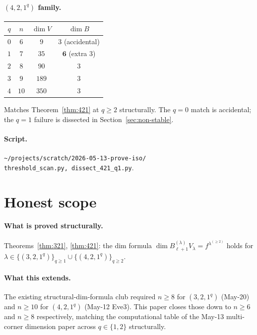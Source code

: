 \documentclass[11pt]{article}
\theoremstyle{definition}
\begin{document}
\paragraph{$(4, 2, 1^q)$ family.}
\begin{center}
\begin{tabular}{cccc}
\toprule
$q$ & $n$ & $\dim V$ & $\dim B$ \\
\midrule
$0$ & $6$  & $9$    & $3$ (accidental) \\
$1$ & $7$  & $35$   & $\mathbf{6}$ (extra $3$) \\
$2$ & $8$  & $90$   & $3$ \\
$3$ & $9$  & $189$  & $3$ \\
$4$ & $10$ & $350$  & $3$ \\
\bottomrule
\end{tabular}
\end{center}
Matches Theorem~\ref{thm:421} at $q \ge 2$ structurally. The $q = 0$
match is accidental; the $q = 1$ failure is dissected in
Section~\ref{sec:non-stable}.

\paragraph{Script.}
\texttt{\textasciitilde/projects/scratch/2026-05-13-prove-iso/}\\
\texttt{threshold\_scan.py, dissect\_421\_q1.py}.

\section{Honest scope}\label{sec:scope}

\paragraph{What is proved structurally.}
Theorems~\ref{thm:321}, \ref{thm:421}: the dim formula
$\dim B^{(\lambda)}_{\ell+1} V_\lambda = f^{\lambda^{(\ge 2)}}$
holds for $\lambda \in \{(3, 2, 1^q)\}_{q \ge 1} \cup
\{(4, 2, 1^q)\}_{q \ge 2}$.

\paragraph{What this extends.}
The existing structural-dim-formula club required $n \ge 8$ for
$(3, 2, 1^q)$ (May-20) and $n \ge 10$ for $(4, 2, 1^q)$ (May-12 Eve3).
This paper closes those down to $n \ge 6$ and $n \ge 8$ respectively,
matching the computational table of the May-13 multi-corner dimension
paper across $q \in \{1, 2\}$ structurally.
\end{document}
